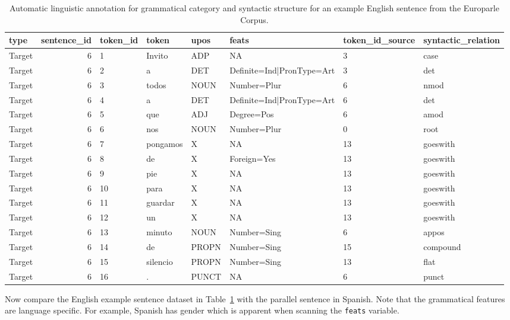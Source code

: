 \documentclass[
  letterpaper,
]{scrbook}
\begin{document}
\hypertarget{tbl-generation-europarle-en-example}{}
\begin{table}
\caption{\label{tbl-generation-europarle-en-example}Automatic linguistic annotation for grammatical category and syntactic
structure for an example English sentence from the Europarle Corpus. }\tabularnewline

\centering
\begin{tabular}{lrllllll}
\toprule
type & sentence\_id & token\_id & token & upos & feats & token\_id\_source & syntactic\_relation\\
\midrule
Target & 6 & 1 & Invito & ADP & NA & 3 & case\\
Target & 6 & 2 & a & DET & Definite=Ind|PronType=Art & 3 & det\\
Target & 6 & 3 & todos & NOUN & Number=Plur & 6 & nmod\\
Target & 6 & 4 & a & DET & Definite=Ind|PronType=Art & 6 & det\\
Target & 6 & 5 & que & ADJ & Degree=Pos & 6 & amod\\
\addlinespace
Target & 6 & 6 & nos & NOUN & Number=Plur & 0 & root\\
Target & 6 & 7 & pongamos & X & NA & 13 & goeswith\\
Target & 6 & 8 & de & X & Foreign=Yes & 13 & goeswith\\
Target & 6 & 9 & pie & X & NA & 13 & goeswith\\
Target & 6 & 10 & para & X & NA & 13 & goeswith\\
\addlinespace
Target & 6 & 11 & guardar & X & NA & 13 & goeswith\\
Target & 6 & 12 & un & X & NA & 13 & goeswith\\
Target & 6 & 13 & minuto & NOUN & Number=Sing & 6 & appos\\
Target & 6 & 14 & de & PROPN & Number=Sing & 15 & compound\\
Target & 6 & 15 & silencio & PROPN & Number=Sing & 13 & flat\\
\addlinespace
Target & 6 & 16 & . & PUNCT & NA & 6 & punct\\
\bottomrule
\end{tabular}
\end{table}

Now compare the English example sentence dataset in
Table~\ref{tbl-generation-europarle-en-example} with the parallel
sentence in Spanish. Note that the grammatical features are language
specific. For example, Spanish has gender which is apparent when
scanning the \texttt{feats} variable.
\end{document}
